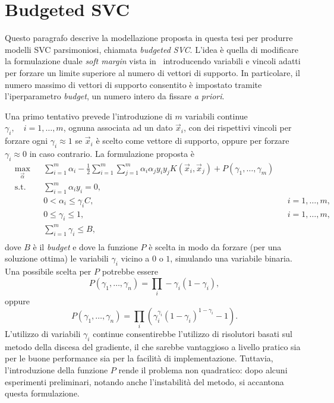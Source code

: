 \section{Budgeted SVC}\label{sec:our_budgeted_svm}
Questo paragrafo descrive la modellazione proposta in questa tesi per produrre modelli SVC parsimoniosi, chiamata \emph{budgeted SVC}.
L'idea è quella di modificare la formulazione duale \emph{soft margin} vista in~ introducendo variabili e vincoli adatti per forzare un limite superiore al numero di vettori di supporto.
In particolare, il numero massimo di vettori di supporto consentito è impostato tramite l'iperparametro \emph{budget}, un numero intero da fissare \emph{a priori}.

Una primo tentativo prevede l'introduzione di $m$ variabili continue $\gamma_i,\quad i=1,\dots,m$, ognuna associata ad un dato $\Vec{x}_i$, con dei rispettivi vincoli per forzare ogni $\gamma_i\approx1$ se $\Vec{x}_i$ è scelto come vettore di supporto, oppure per forzare $\gamma_i\approx0$ in caso contrario.
La formulazione proposta è 
\begin{equation}\label{eq:budget_svc:continuous_gamma_formulation}
\begin{aligned}
& \max_{\Vec{\alpha}}    && \sum_{i=1}^{m}\alpha_i - \frac{1}{2}\sum_{i=1}^{m}\sum_{j=1}^{m}\alpha_i\alpha_jy_iy_jK(\Vec{x}_i, \Vec{x}_j) +P(\gamma_1, \dots, \gamma_m)\\
& \textrm{s.t.} && \sum_{i=1}^{m} \alpha_iy_i = 0,                   \\
&               && 0 < \alpha_i \leq \gamma_iC,   && i=1,\dots,m,  \\
&               && 0 \leq \gamma_i \leq 1,           && i=1, \dots,m,\\
&               && \sum_{i=1}^{m} \gamma_i \leq B,                   \\
\end{aligned}
\end{equation}
dove $B$ è il \emph{budget} e dove la funzione $P$ è scelta in modo da forzare (per una soluzione ottima) le variabili $\gamma_i$ vicino a $0$ o $1$, simulando una variabile binaria.
Una possibile scelta per $P$ potrebbe essere 
$$P(\gamma_1, \dots, \gamma_n) = \prod_i -\gamma_i (1 - \gamma_i),$$
oppure 
$$P(\gamma_1, \dots, \gamma_n) = \prod_i \left( \gamma_i^{\gamma_i} (1 - \gamma_i)^{1 - \gamma_i} - 1 \right).$$
%
%
L'utilizzo di variabili $\gamma_i$ continue consentirebbe l'utilizzo di risolutori basati sul metodo della discesa del gradiente, il che sarebbe vantaggioso a livello pratico sia per le buone performance sia per la facilità di implementazione. 
Tuttavia, l'introduzione della funzione $P$ rende il problema non quadratico: dopo alcuni esperimenti preliminari, notando anche l'instabilità del metodo, si accantona questa formulazione.

